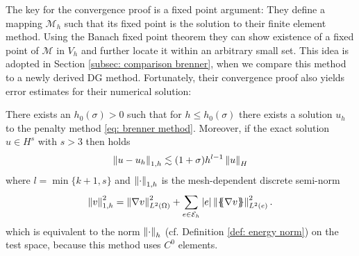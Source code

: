 The key for the convergence proof is a fixed point argument: %
They define a mapping $\mathcal M_h$ such that its fixed point is the solution to their finite element method. 
Using the Banach fixed point theorem they can show existence of a fixed point of $\mathcal M$ in $V_h$ and further locate it within an arbitrary small set. This idea is adopted in Section \ref{subsec: comparison brenner}, when we compare this method to a newly derived DG method. Fortunately, their convergence proof also yields error estimates for their numerical solution:
\begin{theorem}\label{thm: error estimate brenner}
	There exists an $h_0(\sigma) > 0$ such that for $h \leq h_0(\sigma)$ there exists a solution $u_h$ to the penalty method \eqref{eq: brenner method}. Moreover, if the exact solution $u \in H^{s}$ with $s>3$ then holds
	\begin{align*}
		\left\lVert u-u_h \right\rVert_{1,h} \lesssim (1+\sigma) h^{l-1} \left\lVert u \right\rVert_H
	\end{align*}
where $l=\min\{k+1,s\}$ and $\left\lVert \cdot  \right\rVert_{1,h}$ is the mesh-dependent discrete semi-norm 
	\[
		\left\lVert v \right\rVert_{1,h}^2 = \left\lVert \nabla v  \right\rVert^2_{L^2(\Omega)} + \sum_{e \in \mathcal{E}_h} |e| \left\lVert \{\!\!\{ \nabla v \}\!\!\} \right\rVert^2_{L^2(e)}.
	\]
which is equivalent to the norm $\left\lVert \cdot \right\rVert_{h}$ (cf. Definition \ref{def: energy norm}) on the test space, because this method uses $C^0$ elements.

\end{theorem}

